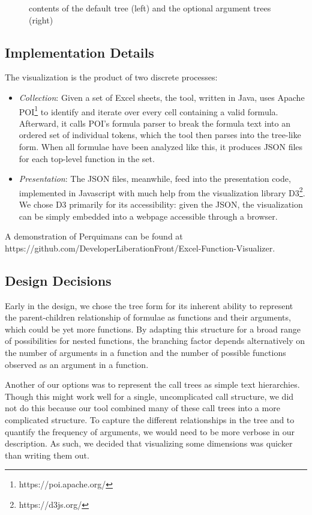 \documentclass[conference]{IEEEtran}
\newcommand{\toolname}{Perquimans\xspace} \newcommand{\toolnameend}{Perquimans}
\begin{document}
\begin{figure}[h]
{			contents of the default tree (left) and the optional argument trees (right)}
		\label{fig:optional} \end{figure}
	
	
	
	\subsection{Implementation Details} The visualization is the product of two
	discrete processes: \begin{itemize} \item \textit{Collection}: Given a set of
		Excel sheets, the tool, written in Java, uses Apache
		POI\footnote{https://poi.apache.org/} to identify and iterate over every cell
		containing a valid formula. Afterward, it calls POI's formula parser to break
		the formula text into an ordered set of individual tokens, which the tool then
		parses into the tree-like form. When all formulae have been analyzed like this,
		it produces JSON files for each top-level function in the set.
		
		\item \textit{Presentation}: The JSON files, meanwhile, feed into the
		presentation code, implemented in Javascript with much help from the
		visualization library D3\footnote{https://d3js.org/}. We chose D3 primarily
		for its accessibility: given the JSON, the visualization can be simply
		embedded into a webpage accessible through a browser. \end{itemize} A
	demonstration of \toolname can be found at
	https://github.com/DeveloperLiberationFront/Excel-Function-Visualizer.
	
	\subsection{Design Decisions} \label{ssec:decisions} Early in the design, we
	chose the tree form for its inherent ability to represent the parent-children
	relationship of formulae as functions and their arguments, which could be yet
	more functions. By adapting this structure for a broad range of possibilities
	for nested functions, the branching factor depends alternatively on the number
	of arguments in a function and the number of possible functions observed as an
	argument in a function. \par
	
	Another of our options was to represent the call trees as simple text
	hierarchies. Though this might work well for a single, uncomplicated call
	structure, we did not do this because our tool combined many of these call
	trees into a more complicated structure. To capture the different relationships
	in the tree and to quantify the frequency of arguments, we would need to be
	more verbose in our description. As such, we decided that visualizing some
	dimensions was quicker than writing them out. \par
	
\end{document}
